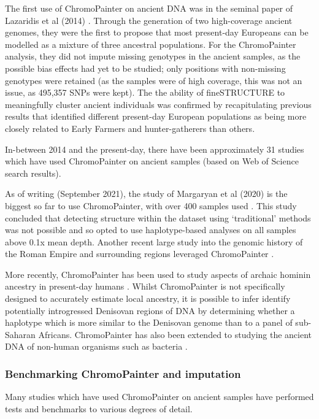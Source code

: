 The first use of ChromoPainter on ancient DNA was in the seminal paper of Lazaridis et al (2014) \cite{Lazaridis2014}. Through the generation of two high-coverage ancient genomes, they were the first to propose that most present-day Europeans can be modelled as a mixture of three ancestral populations. For the ChromoPainter analysis, they did not impute missing genotypes in the ancient samples, as the possible bias effects had yet to be studied; only positions with non-missing genotypes were retained (as the samples were of high coverage, this was not an issue, as 495,357 SNPs were kept). The the ability of fineSTRUCTURE to meaningfully cluster ancient individuals was confirmed by recapitulating previous results that identified different present-day European populations as being more closely related to Early Farmers and hunter-gatherers than others. 

In-between 2014 and the present-day, there have been approximately 31 studies which have used ChromoPainter on ancient samples (based on Web of Science search results). 

As of writing (September 2021), the study of Margaryan et al (2020) is the biggest so far to use ChromoPainter, with over 400 samples used \cite{margaryan2020population}. This study concluded that detecting structure within the dataset using `traditional' methods was not possible and so opted to use haplotype-based analyses on all samples above 0.1x mean depth. Another recent large study into the genomic history of the Roman Empire and surrounding regions leveraged ChromoPainter \cite{antonio2019ancient}.

More recently, ChromoPainter has been used to study aspects of archaic hominin ancestry in present-day humans \cite{JACOBS20191010, teixeira2021widespread}. Whilst ChromoPainter is not specifically designed to accurately estimate local ancestry, it is possible to infer identify potentially introgressed Denisovan regions of DNA by determining whether a haplotype which is more similar to the Denisovan genome than to a panel of sub-Saharan Africans. ChromoPainter has also been extended to studying the ancient DNA of non-human organisms such as bacteria \cite{Moodleye2015523118}. 

\subsubsection{Benchmarking ChromoPainter and imputation}

Many studies which have used ChromoPainter on ancient samples have performed tests and benchmarks to various degrees of detail. 

